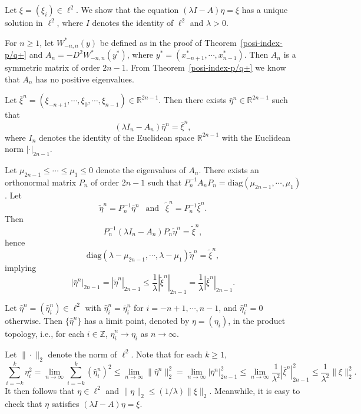\documentclass[12pt]{article}
\newcommand{\R}{\mathbb{R}}
\newcommand{\Z}{\mathbb{Z}}
\newcommand{\begeq}{\begin{equation}}
\newcommand{\eeq}{\end{equation}}
\begin{document}
Let $\xi=(\xi_i)\in\ell^2$. We show that the equation $(\lambda I-A)\eta=\xi$ has a unique solution in $\ell^2$, where $I$ denotes the identity of $\ell^2$ and $\lambda>0$.

For $n\geq 1$, let $W_{-n,n}^*(y)$ be defined as in the proof of Theorem~\ref{posi-index-p/q+} and $A_n=-D^2W_{-n,n}^*(y^*)$, where $y^*=(x_{-n+1}^*,\cdots,x_{n-1}^*)$. Then $A_n$ is a symmetric matrix of order $2n-1$. From Theorem~\ref{posi-index-p/q+} we know that $A_n$ has no positive eigenvalues.

Let $\bar{\xi}^n=(\xi_{-n+1},\cdots,\xi_0,\cdots,\xi_{n-1})\in\R^{2n-1}$. Then there exists $\bar{\eta}^n\in\R^{2n-1}$ such that
$$
(\lambda I_n-A_n)\bar{\eta}^n=\bar{\xi}^n,
$$
where $I_n$ denotes the identity of the Euclidean space $\R^{2n-1}$ with the Euclidean norm $|\cdot|_{2n-1}$.

Let $\mu_{2n-1}\leq\cdots\leq\mu_1\leq 0$ denote the eigenvalues of $A_n$. There exists an orthonormal matrix $P_n$ of order $2n-1$ such that $P_n^{-1}A_nP_n=\mbox{diag}(\mu_{2n-1},\cdots,\mu_1)$. Let
$$
\tilde{\eta}^n=P_n^{-1}\bar{\eta}^n\  \ \mbox{ and }\ \ \tilde{\xi}^n=P_n^{-1}\bar{\xi}^n.
$$
Then
$$
P_n^{-1}(\lambda I_n-A_n)P_n\tilde{\eta}^n=\tilde{\xi}^n,
$$
hence
$$
\mbox{diag}(\lambda-\mu_{2n-1},\cdots,\lambda-\mu_1)\tilde{\eta}^n=\tilde{\xi}^n,
$$
implying
\begeq\label{etabar}
|\bar{\eta}^n|_{2n-1}=|\tilde{\eta}^n|_{2n-1}\leq \frac{1}{\lambda}|\tilde{\xi}^n|_{2n-1}=
\frac{1}{\lambda}|\bar{\xi}^n|_{2n-1}.
\eeq

Let $\hat{\eta}^n=(\hat{\eta}_i^n)\in\ell^2$ with $\hat{\eta}_i^n=\bar{\eta}_i^n$ for $i=-n+1,\cdots,n-1$, and $\hat{\eta}_i^n=0$ otherwise. Then $\{\hat{\eta}^n\}$ has a limit point, denoted by $\eta=(\eta_i)$, in the product topology, i.e., for each $i\in\Z$, $\hat{\eta}_i^n\to\eta_i$ as $n\to\infty$.

Let $\|\cdot\|_2$ denote the norm of $\ell^2$. Note that for each $k\geq 1$,
$$
\sum_{i=-k}^k\eta_i^2=\lim_{n\to\infty}\sum_{i=-k}^k(\hat{\eta}_i^n)^2\leq\lim_{n\to\infty}
\|\hat{\eta}^n\|_2^2=\lim_{n\to\infty}|\bar{\eta}^n|_{2n-1}^2\leq\lim_{n\to\infty}
\frac{1}{\lambda^2}
|\bar{\xi}^n|_{2n-1}^2\leq\frac{1}{\lambda^2}\|\xi\|_2^2.
$$
It then follows that $\eta\in\ell^2$ and $\|\eta\|_2\leq (1/\lambda)\|\xi\|_2$. Meanwhile, it is easy to check that $\eta$ satisfies $(\lambda I-A)\eta=\xi$.
\end{document}
